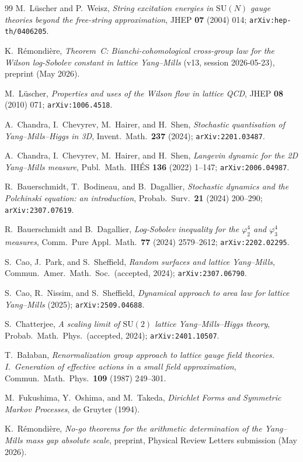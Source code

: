 \documentclass[aps,prl,reprint,superscriptaddress,floatfix,nofootinbib,amssymb]{revtex4-2}
\theoremstyle{definition}
\theoremstyle{remark}
\begin{document}
\begin{thebibliography}{99}
M.~L\"uscher and P.~Weisz,
\emph{String excitation energies in $\mathrm{SU}(N)$ gauge theories
beyond the free-string approximation},
JHEP \textbf{07} (2004) 014; \texttt{arXiv:hep-th/0406205}.

K.~R\'emondi\`ere,
\emph{Theorem~C: Bianchi-cohomological cross-group law for the
Wilson log-Sobolev constant in lattice Yang--Mills}
(v13, session 2026-05-23),
preprint (May 2026).

M.~L\"uscher,
\emph{Properties and uses of the Wilson flow in lattice QCD},
JHEP \textbf{08} (2010) 071; \texttt{arXiv:1006.4518}.

A.~Chandra, I.~Chevyrev, M.~Hairer, and H.~Shen,
\emph{Stochastic quantisation of Yang--Mills--Higgs in 3D},
Invent.~Math.~\textbf{237} (2024); \texttt{arXiv:2201.03487}.

A.~Chandra, I.~Chevyrev, M.~Hairer, and H.~Shen,
\emph{Langevin dynamic for the 2D Yang--Mills measure},
Publ.~Math.~IH\'ES \textbf{136} (2022) 1--147;
\texttt{arXiv:2006.04987}.

R.~Bauerschmidt, T.~Bodineau, and B.~Dagallier,
\emph{Stochastic dynamics and the Polchinski equation: an
introduction}, Probab.~Surv.~\textbf{21} (2024) 200--290;
\texttt{arXiv:2307.07619}.

R.~Bauerschmidt and B.~Dagallier,
\emph{Log-Sobolev inequality for the $\varphi^{4}_{2}$ and
$\varphi^{4}_{3}$ measures},
Comm.~Pure Appl.~Math.~\textbf{77} (2024) 2579--2612;
\texttt{arXiv:2202.02295}.

S.~Cao, J.~Park, and S.~Sheffield,
\emph{Random surfaces and lattice Yang--Mills},
Commun.~Amer.~Math.~Soc.~(accepted, 2024);
\texttt{arXiv:2307.06790}.

S.~Cao, R.~Nissim, and S.~Sheffield,
\emph{Dynamical approach to area law for lattice Yang--Mills}
(2025); \texttt{arXiv:2509.04688}.

S.~Chatterjee,
\emph{A scaling limit of $\mathrm{SU}(2)$ lattice Yang--Mills--Higgs
theory}, Probab.~Math.~Phys.~(accepted, 2024);
\texttt{arXiv:2401.10507}.

T.~Bałaban,
\emph{Renormalization group approach to lattice gauge field
theories. I.~Generation of effective actions in a small field
approximation},
Commun.~Math.~Phys.~\textbf{109} (1987) 249--301.

M.~Fukushima, Y.~Oshima, and M.~Takeda,
\emph{Dirichlet Forms and Symmetric Markov Processes},
de Gruyter (1994).

K.~R\'emondi\`ere,
\emph{No-go theorems for the arithmetic determination of the
Yang--Mills mass gap absolute scale},
preprint, Physical Review Letters submission (May 2026).

\end{thebibliography}
\end{document}
